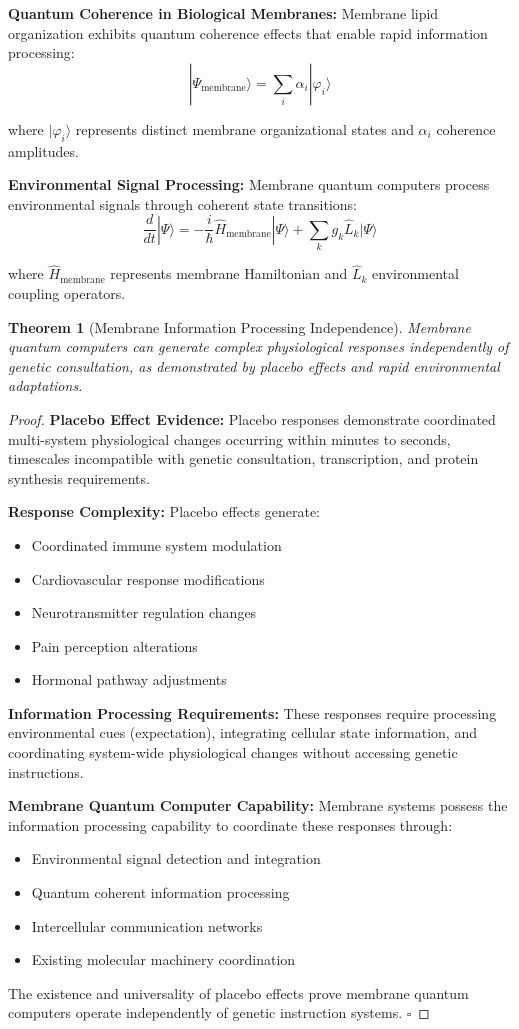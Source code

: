 \documentclass[12pt,a4paper]{article}
\newtheorem{theorem}{Theorem}[section]
\begin{document}
\textbf{Quantum Coherence in Biological Membranes:}
Membrane lipid organization exhibits quantum coherence effects that enable rapid information processing:
$$|\Psi_{\text{membrane}}\rangle = \sum_{i} α_i |φ_i\rangle$$

where $|φ_i\rangle$ represents distinct membrane organizational states and $α_i$ coherence amplitudes.

\textbf{Environmental Signal Processing:}
Membrane quantum computers process environmental signals through coherent state transitions:
$$\frac{d}{dt}|\Psi\rangle = -\frac{i}{\hbar}\hat{H}_{\text{membrane}}|\Psi\rangle + \sum_k g_k \hat{L}_k|\Psi\rangle$$

where $\hat{H}_{\text{membrane}}$ represents membrane Hamiltonian and $\hat{L}_k$ environmental coupling operators.

\begin{theorem}[Membrane Information Processing Independence]
Membrane quantum computers can generate complex physiological responses independently of genetic consultation, as demonstrated by placebo effects and rapid environmental adaptations.
\end{theorem}

\begin{proof}
\textbf{Placebo Effect Evidence:}
Placebo responses demonstrate coordinated multi-system physiological changes occurring within minutes to seconds, timescales incompatible with genetic consultation, transcription, and protein synthesis requirements.

\textbf{Response Complexity:}
Placebo effects generate:
\begin{itemize}
\item Coordinated immune system modulation
\item Cardiovascular response modifications
\item Neurotransmitter regulation changes
\item Pain perception alterations
\item Hormonal pathway adjustments
\end{itemize}

\textbf{Information Processing Requirements:}
These responses require processing environmental cues (expectation), integrating cellular state information, and coordinating system-wide physiological changes without accessing genetic instructions.

\textbf{Membrane Quantum Computer Capability:}
Membrane systems possess the information processing capability to coordinate these responses through:
\begin{itemize}
\item Environmental signal detection and integration
\item Quantum coherent information processing
\item Intercellular communication networks
\item Existing molecular machinery coordination
\end{itemize}

The existence and universality of placebo effects prove membrane quantum computers operate independently of genetic instruction systems. $\square$
\end{proof}
\end{document}
